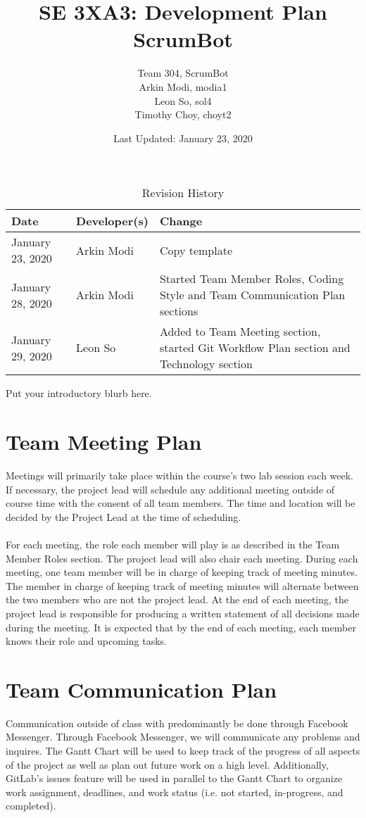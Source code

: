 \documentclass{article}
\title{SE 3XA3: Development Plan\\ScrumBot}
\author{
    Team 304, ScrumBot
        \\ Arkin Modi, modia1
        \\ Leon So, sol4
        \\ Timothy Choy, choyt2
}
\date{Last Updated: January 23, 2020}
\begin{document}
\begin{table}[hp]
    \caption{Revision History} \label{TblRevisionHistory}
    \begin{tabularx}{\textwidth}{llX}
        \toprule
            \textbf{Date} & \textbf{Developer(s)} & \textbf{Change}\\
        \midrule
            January 23, 2020 & Arkin Modi & Copy template\\
            January 28, 2020 & Arkin Modi & Started Team Member Roles, Coding Style and Team Communication Plan sections\\
            January 29, 2020 & Leon So & Added to Team Meeting section, started Git Workflow Plan section and Technology section\\
        \bottomrule
    \end{tabularx}
\end{table}

\newpage

\maketitle

Put your introductory blurb here.

\section{Team Meeting Plan}
Meetings will primarily take place within the course's two lab session each week. If necessary, the project lead will schedule any additional meeting outside of course time with the consent of all team members. The time and location will be decided by the Project Lead at the time of scheduling. 
\\\\
\noindent For each meeting, the role each member will play is as described in the Team Member Roles section. The project lead will also chair each meeting. During each meeting, one team member will be in charge of keeping track of meeting minutes. The member in charge of keeping track of meeting minutes will alternate between the two members who are not the project lead. At the end of each meeting, the project lead is responsible for producing a written statement of all decisions made during the meeting. It is expected that by the end of each meeting, each member knows their role and upcoming tasks.

\section{Team Communication Plan}
Communication outside of class with predominantly be done through Facebook Messenger. Through Facebook Messenger, we will communicate any problems and inquires. The Gantt Chart will be used to keep track of the progress of all aspects of the project as well as plan out future work on a high level. Additionally, GitLab's issues feature will be used in parallel to the Gantt Chart to organize work assignment, deadlines, and work status (i.e. not started, in-progress, and completed).
\end{document}

